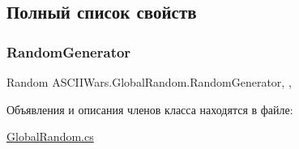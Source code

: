 \subsection{Полный список свойств}
\hypertarget{class_a_s_c_i_i_wars_1_1_global_random_a9d81774ce986f79fb427fd575463d63b}{}\label{class_a_s_c_i_i_wars_1_1_global_random_a9d81774ce986f79fb427fd575463d63b} 
\subsubsection{\texorpdfstring{Random\+Generator}{RandomGenerator}}
{\footnotesize\ttfamily Random A\+S\+C\+I\+I\+Wars.\+Global\+Random.\+Random\+Generator\hspace{0.3cm}{\ttfamily [static]}, {\ttfamily [get]}, {}}



Объявления и описания членов класса находятся в файле\+:\begin{DoxyCompactItemize}
\item 
\hyperlink{_global_random_8cs}{Global\+Random.\+cs}\end{DoxyCompactItemize}
